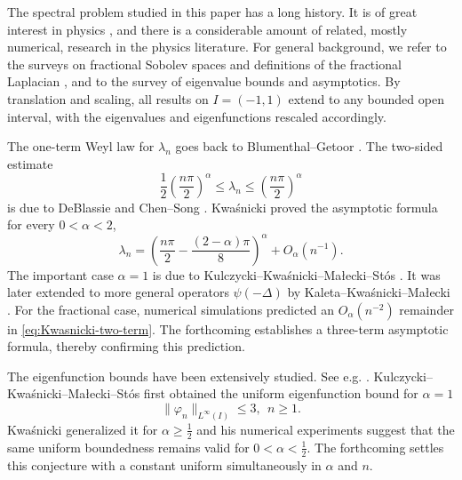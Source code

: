 \documentclass[11pt]{amsart}
\numberwithin{equation}{section}
\theoremstyle{remark}
\newcommand{\norm}[2][]{\lVert #2\rVert_{#1}}
\begin{document}
  





The spectral problem studied in this paper has a long history. It is of great interest in physics \cite{ZRK}, and there is a considerable amount of related, mostly numerical,
research in the physics literature. For general background, we refer to the surveys on fractional Sobolev spaces
and definitions of the fractional Laplacian
\cite{DNPV,KwasnickiDefinitions,LischkeEtAl}, and to
the survey \cite{FrankSurvey} of eigenvalue bounds and asymptotics. By translation and scaling, all results on $I=(-1,1)$ extend to any bounded open interval, with the eigenvalues and  eigenfunctions rescaled accordingly.

The one-term Weyl law for $\lambda_n$ 
goes back to Blumenthal--Getoor
\cite{BlumenthalGetoor}.  
The two-sided estimate 
$$
 \frac12\left(\frac{n\pi}{2}\right)^\alpha
 \le \lambda_n\le
 \left(\frac{n\pi}{2}\right)^\alpha$$ is due to DeBlassie \cite{De} and Chen--Song \cite{ChenSongEigen}.  
  Kwa\'snicki \cite[Theorem~1]{KwasnickiInterval} proved the asymptotic formula for every $0<\alpha<2$,
\begin{equation}\label{eq:Kwasnicki-two-term}
 \lambda_n=
 \left(\frac{n\pi}{2}-\frac{(2-\alpha)\pi}{8}\right)^\alpha
 +O_\alpha(n^{-1}).
\end{equation}
The important case $\alpha=1$ is due to Kulczycki--Kwa\'snicki--Ma{\l}ecki--St\'os \cite[Theorem~6]{KulczyckiKwasnickiMaleckiStos}. It
was later extended to  more general operators $\psi(-\Delta)$ by
Kaleta--Kwa\'snicki--Ma{\l}ecki
\cite{KaletaKwasnickiMalecki}.  For the fractional case, numerical simulations \cite[Remark~1.5]{KaletaKwasnickiMalecki} predicted an $O_\alpha(n^{-2})$ remainder in \eqref{eq:Kwasnicki-two-term}.  The forthcoming   establishes a three-term asymptotic formula, thereby confirming this prediction.

The eigenfunction bounds have been extensively studied. See e.g.  \cite{sogge88,smithsogge,HuangSireZhang,jmpa, DeBlassieMendez,ChenWethLogarithmic,FeulefackJarohsWeth}.  
Kulczycki--Kwa\'snicki--Ma{\l}ecki--St\'os \cite[Corollary~5]{KulczyckiKwasnickiMaleckiStos} first obtained the uniform eigenfunction bound for $\alpha=1$
\begin{equation}
	\norm[L^\infty(I)]{\varphi_n}\le 3,\  \ n\ge1.
\end{equation}
Kwa\'snicki  \cite[Proposition~2]{KwasnickiInterval} generalized it  for $\alpha\ge\tfrac12$
 and his numerical
experiments suggest that the same uniform boundedness remains valid
for $0<\alpha<\tfrac12$.  The forthcoming  settles this conjecture with a constant uniform simultaneously in \(\alpha\) and \(n\).  
\end{document}
